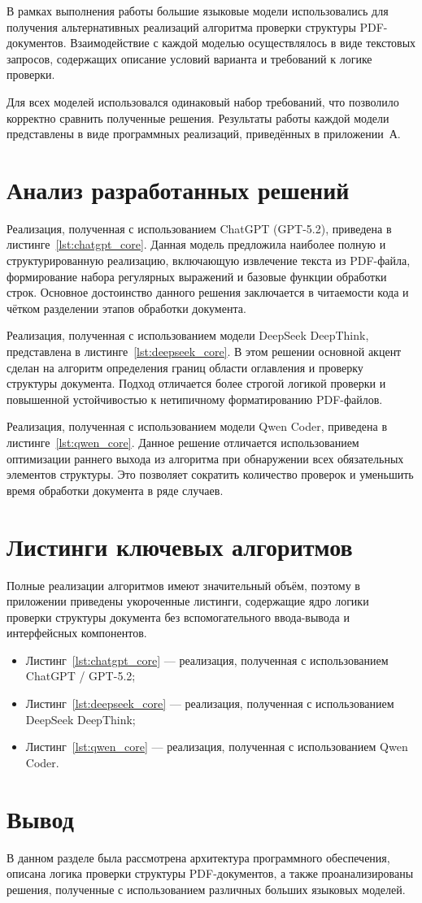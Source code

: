 В рамках выполнения работы большие языковые модели использовались
для получения альтернативных реализаций алгоритма проверки структуры
PDF-документов. Взаимодействие с каждой моделью осуществлялось
в виде текстовых запросов, содержащих описание условий варианта
и требований к логике проверки.

Для всех моделей использовался одинаковый набор требований,
что позволило корректно сравнить полученные решения.
Результаты работы каждой модели представлены в виде программных
реализаций, приведённых в приложении~А.

\section{Анализ разработанных решений}

Реализация, полученная с использованием ChatGPT (GPT-5.2),
приведена в листинге~\ref{lst:chatgpt_core}.
Данная модель предложила наиболее полную и структурированную реализацию,
включающую извлечение текста из PDF-файла, формирование набора регулярных
выражений и базовые функции обработки строк.
Основное достоинство данного решения заключается в читаемости кода
и чётком разделении этапов обработки документа.

Реализация, полученная с использованием модели DeepSeek DeepThink,
представлена в листинге~\ref{lst:deepseek_core}.
В этом решении основной акцент сделан на алгоритм определения границ
области оглавления и проверку структуры документа.
Подход отличается более строгой логикой проверки и повышенной устойчивостью
к нетипичному форматированию PDF-файлов.

Реализация, полученная с использованием модели Qwen Coder,
приведена в листинге~\ref{lst:qwen_core}.
Данное решение отличается использованием оптимизации раннего выхода
из алгоритма при обнаружении всех обязательных элементов структуры.
Это позволяет сократить количество проверок и уменьшить время обработки
документа в ряде случаев.

\section{Листинги ключевых алгоритмов}

Полные реализации алгоритмов имеют значительный объём, поэтому в приложении
приведены укороченные листинги, содержащие ядро логики проверки структуры
документа без вспомогательного ввода-вывода и интерфейсных компонентов.
\begin{itemize}
    \item Листинг~\ref{lst:chatgpt_core} — реализация, полученная с использованием ChatGPT / GPT-5.2;
    \item Листинг~\ref{lst:deepseek_core} — реализация, полученная с использованием DeepSeek DeepThink;
    \item Листинг~\ref{lst:qwen_core} — реализация, полученная с использованием Qwen Coder.
\end{itemize}

\section{Вывод}

В данном разделе была рассмотрена архитектура программного обеспечения,
описана логика проверки структуры PDF-документов, а также проанализированы
решения, полученные с использованием различных больших языковых моделей.
